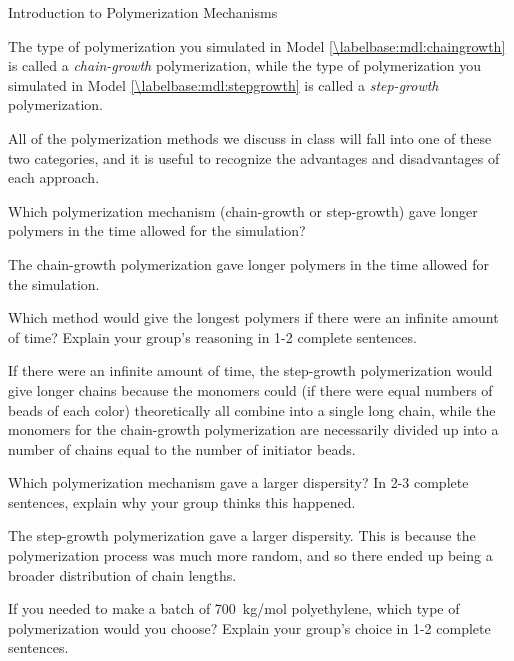 \begin{activity}{Introduction to Polymerization Mechanisms}
\begin{ctqs}
\end{ctqs}

\begin{infobox}
	The type of polymerization you simulated in Model  \ref{\labelbase:mdl:chaingrowth} is called a \emph{chain-growth} polymerization, while the type of polymerization you simulated in Model  \ref{\labelbase:mdl:stepgrowth} is called a \emph{step-growth} polymerization.
	
	All of the polymerization methods we discuss in class will fall into one of these two categories, and it is useful to recognize the advantages and disadvantages of each approach.
\end{infobox}

\begin{ctqs}
	\question Which polymerization mechanism (chain-growth or step-growth) gave longer polymers in the time allowed for the simulation?
	
		\begin{solution}[1in]
			The chain-growth polymerization gave longer polymers in the time allowed for the simulation.
		\end{solution}
	
	\question Which method would give the longest polymers if there were an infinite amount of time?  Explain your group's reasoning in 1-2 complete sentences.
	
		\begin{solution}[1.75in]
			If there were an infinite amount of time, the step-growth polymerization would give longer chains because the monomers could (if there were equal numbers of beads of each color) theoretically all combine into a single long chain, while the monomers for the chain-growth polymerization are necessarily divided up into a number of chains equal to the number of initiator beads.
		\end{solution}
	
	\question Which polymerization mechanism gave a larger dispersity?  In 2-3 complete sentences, explain why your group thinks this happened.
	
		\begin{solution}[1.75in]
			The step-growth polymerization gave a larger dispersity.  This is because the polymerization process was much more random, and so there ended up being a broader distribution of chain lengths.
		\end{solution}
	
	\question If you needed to make a batch of 700~kg/mol polyethylene, which type of polymerization would you choose?  Explain your group's choice in 1-2 complete sentences.
	

\end{ctqs}
\end{activity}
